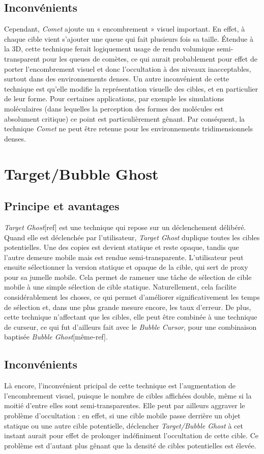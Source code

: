 	\subsection{Inconvénients}
	Cependant, \emph{Comet} ajoute un « encombrement » visuel important. En effet, à chaque cible vient s'ajouter une queue qui fait plusieurs fois sa taille. Étendue à la 3D, cette technique ferait logiquement usage de rendu volumique semi-transparent pour les queues de comètes, ce qui aurait probablement pour effet de porter l'encombrement visuel et donc l'occultation à des niveaux inacceptables, surtout dans des environnements denses. Un autre inconvénient de cette technique est qu'elle modifie la représentation visuelle des cibles, et en particulier de leur forme. Pour certaines applications, par exemple les simulations moléculaires (dans lequelles la perception des formes des molécules est absolument critique) ce point est particulièrement gênant. Par conséquent, la technique \emph{Comet} ne peut être retenue pour les environnements tridimensionnels denses.

\section{Target/Bubble Ghost}
	\subsection{Principe et avantages}
	\emph{Target Ghost}[ref] est une technique qui repose sur un déclenchement délibéré. Quand elle est déclenchée par l'utilisateur, \emph{Target Ghost} duplique toutes les cibles potentielles. Une des copies est devient statique et reste opaque, tandis que l'autre demeure mobile mais est rendue semi-transparente. L'utilisateur peut ensuite sélectionner la version statique et opaque de la cible, qui sert de proxy pour sa jumelle mobile. Cela permet de ramener une tâche de sélection de cible mobile à une simple sélection de cible statique. Naturellement, cela facilite considérablement les choses, ce qui permet d'améliorer significativement les temps de sélection et, dans une plus grande mesure encore, les taux d'erreur. De plus, cette technique n'affectant que les cibles, elle peut être combinée à une technique de curseur, ce qui fut d'ailleurs fait avec le \emph{Bubble Cursor}, pour une combinaison baptisée \emph{Bubble Ghost}[même-ref].
		
	\subsection{Inconvénients}
	Là encore, l'inconvénient pricipal de cette technique est l'augmentation de l'encombrement visuel, puisque le nombre de cibles affichées double, même si la moitié d'entre elles sont semi-transparentes. Elle peut par ailleurs aggraver le problème d'occultation : en effet, si une cible mobile passe derrière un objet statique ou une autre cible potentielle, déclencher \emph{Target/Bubble Ghost} à cet instant aurait pour effet de prolonger indéfiniment l'occultation de cette cible. Ce problème est d'autant plus gênant que la densité de cibles potentielles est élevée.
		
